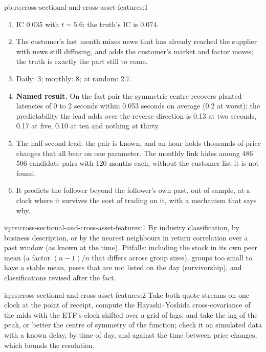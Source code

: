 \begin{solution}{pb:rs:cross-sectional-and-cross-asset-features:1}
\begin{enumerate}
and Huth and Abergel found that a naive market-order strategy could not profit from the lead because of the spread. The feature is used to
move quotes or to time passive orders.
\item IC 0.035 with $t = 5.6$; the truth's IC is 0.074.
\item The customer's last month mixes news that has already reached the supplier with news still diffusing, and adds the customer's
market and factor moves; the truth is exactly the part still to come.
\item Daily: 3; monthly: 8; at random: 2.7.
\item \textbf{Named result.} On the fast pair the symmetric centre recovers planted latencies of 0 to 2 seconds within 0.053 seconds on
average (0.2 at worst); the predictability the lead adds over the reverse direction is 0.13 at two seconds, 0.17 at five, 0.10 at ten
and nothing at thirty.
\item The half-second lead: the pair is known, and an hour holds thousands of price changes that all bear on one parameter. The monthly
link hides among 486\,506 candidate pairs with 120 months each; without the customer list it is not found.
\item It predicts the follower beyond the follower's own past, out of sample, at a clock where it survives the cost of trading on it,
with a mechanism that says why.
\end{enumerate}
\end{solution}

\begin{solution}{iq:rs:cross-sectional-and-cross-asset-features:1}
By industry classification, by business description, or by the nearest neighbours in return correlation over a past window (as known at
the time). Pitfalls: including the stock in its own peer mean (a factor $(n-1)/n$ that differs across group sizes), groups too small to
have a stable mean, peers that are not listed on the day (survivorship), and classifications revised after the fact.
\end{solution}

\begin{solution}{iq:rs:cross-sectional-and-cross-asset-features:2}
Take both quote streams on one clock at the point of receipt, compute the Hayashi--Yoshida cross-covariance of the mids with the ETF's
clock shifted over a grid of lags, and take the lag of the peak, or better the centre of symmetry of the function; check it on
simulated data with a known delay, by time of day, and against the time between price changes, which bounds the resolution.
\end{solution}

